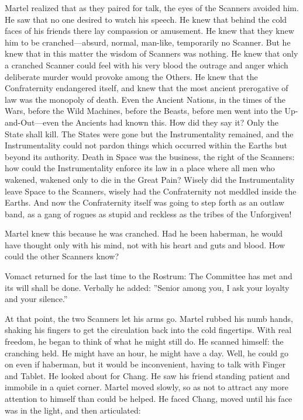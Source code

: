 Martel realized that as they paired for talk, the eyes of the Scanners avoided him. He saw that no one desired to watch his speech. He knew that behind the cold faces of his friends there lay compassion or amusement. He knew that they knew him to be cranched---absurd, normal, man-like, temporarily no Scanner. But he knew that in this matter the wisdom of Scanners was nothing. He knew that only a cranched Scanner could feel with his very blood the outrage and anger which deliberate murder would provoke among the Others. He knew that the Confraternity endangered itself, and knew that the most ancient prerogative of law was the monopoly of death. Even the Ancient Nations, in the times of the Wars, before the Wild Machines, before the Beasts, before men went into the Up-and-Out---even the Ancients had known this. How did they say it? Only the State shall kill. The States were gone but the Instrumentality remained, and the Instrumentality could not pardon things which occurred within the Earths but beyond its authority. Death in Space was the business, the right of the Scanners: how could the Instrumentality enforce its law in a place where all men who wakened, wakened only to die in the Great Pain? Wisely did the Instrumentality leave Space to the Scanners, wisely had the Confraternity not meddled inside the Earths. And now the Confraternity itself was going to step forth as an outlaw band, as a gang of rogues as stupid and reckless as the tribes of the Unforgiven!

Martel knew this because he was cranched. Had he been haberman, he would have thought only with his mind, not with his heart and guts and blood. How could the other Scanners know?

Vomact returned for the last time to the Rostrum: The Committee has met and its will shall be done. Verbally he added: ''Senior among you, I ask your loyalty and your silence.''

At that point, the two Scanners let his arms go. Martel rubbed his numb hands, shaking his fingers to get the circulation back into the cold fingertips. With real freedom, he began to think of what he might still do. He scanned himself: the cranching held. He might have an hour, he might have a day. Well, he could go on even if haberman, but it would be inconvenient, having to talk with Finger and Tablet. He looked about for Chang. He saw his friend standing patient and immobile in a quiet corner. Martel moved slowly, so as not to attract any more attention to himself than could be helped. He faced Chang, moved until his face was in the light, and then articulated:

